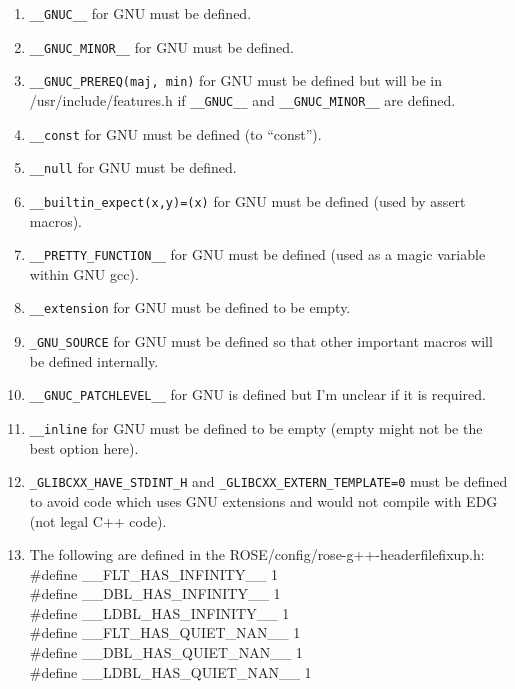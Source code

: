 {\begin{enumerate}
        \item {\tt \_\_GNUC\_\_} for GNU must be defined.

        \item {\tt \_\_GNUC\_MINOR\_\_} for GNU must be defined.

        \item {\tt \_\_GNUC\_PREREQ(maj, min)} for GNU must be defined but will be in
        /usr/include/features.h if {\tt \_\_GNUC\_\_} and {\tt \_\_GNUC\_MINOR\_\_} are defined.

        \item {\tt \_\_const} for GNU must be defined (to ``const'').

        \item {\tt \_\_null} for GNU must be defined.

        \item {\tt \_\_builtin\_expect(x,y)=(x)} for GNU must be defined (used by assert macros).

        \item {\tt \_\_PRETTY\_FUNCTION\_\_} for GNU must be defined (used as a magic
        variable within GNU gcc).

        \item {\tt \_\_extension} for GNU must be defined to be empty.

        \item {\tt \_GNU\_SOURCE} for GNU must be defined so that other important macros
        will be defined internally.

        \item {\tt \_\_GNUC\_PATCHLEVEL\_\_} for GNU is defined but I'm unclear if it is
        required.

        \item {\tt \_\_inline} for GNU must be defined to be empty (empty might not be the
        best option here).

        \item {\tt \_GLIBCXX\_HAVE\_STDINT\_H} and {\tt \_GLIBCXX\_EXTERN\_TEMPLATE=0}
        must be defined to avoid code which uses GNU extensions and would not compile with EDG
        (not legal C++ code).

        \item The following are defined in the ROSE/config/rose-g++-headerfilefixup.h: \\
             \#define \_\_FLT\_HAS\_INFINITY\_\_ 1 \\
             \#define \_\_DBL\_HAS\_INFINITY\_\_ 1 \\
             \#define \_\_LDBL\_HAS\_INFINITY\_\_ 1 \\
             \#define \_\_FLT\_HAS\_QUIET\_NAN\_\_ 1 \\
             \#define \_\_DBL\_HAS\_QUIET\_NAN\_\_ 1 \\
             \#define \_\_LDBL\_HAS\_QUIET\_NAN\_\_ 1 

    \end{enumerate}
}

